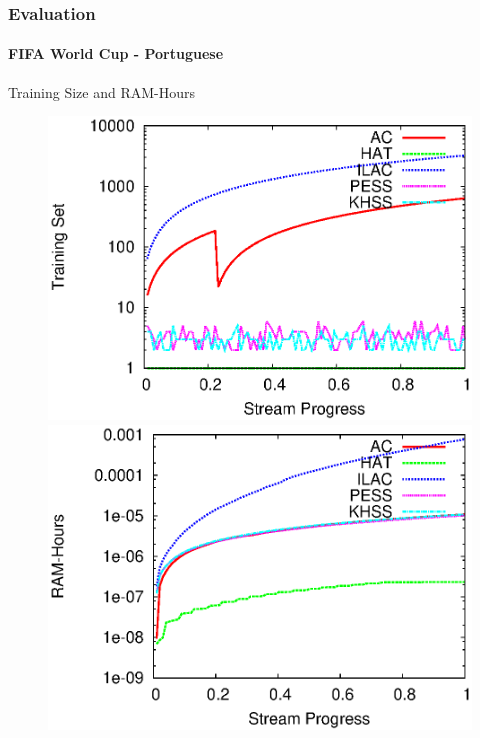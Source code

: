 \documentclass[14pt]{beamer}
\begin{document}
\begin{frame}
\frametitle{Evaluation}
\framesubtitle{FIFA World Cup - Portuguese}
Training Size and RAM-Hours
\begin{figure}[htp!]
\label{fig:fm_2}
\centering
\includegraphics[scale=0.45]{pt_window.eps}
\includegraphics[scale=0.45]{pt_ramhours.eps}
\end{figure}
\end{frame}

\end{document}
